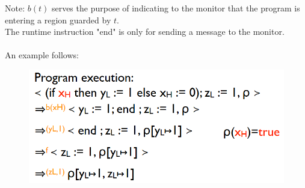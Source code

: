 \documentclass[10pt,a4paper]{report}
\begin{document}
Note: $b(t)$ serves the purpose of indicating  to the monitor that the program is entering a region guarded by $t$.\\
The runtime instruction "end" is only for sending a message to the monitor.\\
\\
An example follows:
\begin{figure}[H]
\centering
\includegraphics[scale=0.4]{32.png}
\end{figure}
\end{document}
